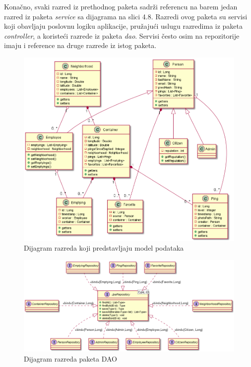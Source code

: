			Konačno, svaki razred iz prethodnog paketa sadrži referencu na barem jedan razred iz paketa \textit{service} sa dijagrama na slici 4.8. Razredi ovog paketa su servisi koji obavljaju poslovnu logiku aplikacije, pružajući uslugu razredima iz paketa \textit{controller}, a koristeći razrede iz paketa \textit{dao}. Servisi često osim na repozitorije imaju i reference na druge razrede iz istog paketa.
			
			
			\begin{figure}[H]
				\includegraphics[scale=0.5]{figures/ModelClassDiagram.PNG}
				\centering
				\caption{Dijagram razreda koji predstavljaju model podataka}
				\label{fig:model-cd}
			\end{figure}
		
			\begin{figure}[H]
				\includegraphics[scale=0.4]{figures/DAOClassDiagram.PNG}
				\centering
				\caption{Dijagram razreda paketa DAO}
				\label{fig:dao-cd}
			\end{figure}
		

